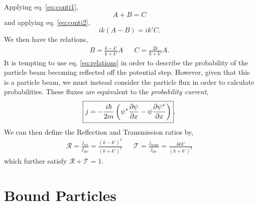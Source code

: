 \documentclass{book}
\begin{document}
Applying eq. \eqref{eq:conti1},
\begin{equation}
	A + B = C
\end{equation}
and applying eq. \eqref{eq:conti2},
\begin{equation}
	ik(A - B) = ik'C.
\end{equation}
We then have the relations,
\begin{align}
	B = \frac{k-k'}{k+k'}A && C = \frac{2k}{k+k'}A. \label{eq:relations}
\end{align}
It is tempting to use eq. \eqref{eq:relations} in order to describe the probability of the particle beam becoming reflected off the potential step. However, given that this is a particle beam, we must instead consider the particle flux in order to calculate probabilities. These fluxes are equivalent to the \textit{probability current},
\begin{equation}
	\boxed{j = -\frac{i\hbar}{2m}\left(\psi^*\pdv{\psi}{x} - \psi \pdv{\psi^*}{x}\right)}.
\end{equation}
We can then define the Reflection and Transmission ratios by,
\begin{align}
	\boxed{\mathcal{R} = \frac{j_{\text{ref}}}{j_{\text{inc}}} = \frac{(k-k')^2}{(k+k')^2}} && \boxed{\mathcal{T} = \frac{j_{\text{trans}}}{j_{\text{inc}}} = \frac{4kk'}{(k+k')^2}}
\end{align}
which further satisfy $\mathcal{R} + \mathcal{T} = 1$.
\section{Bound Particles}
\end{document}
